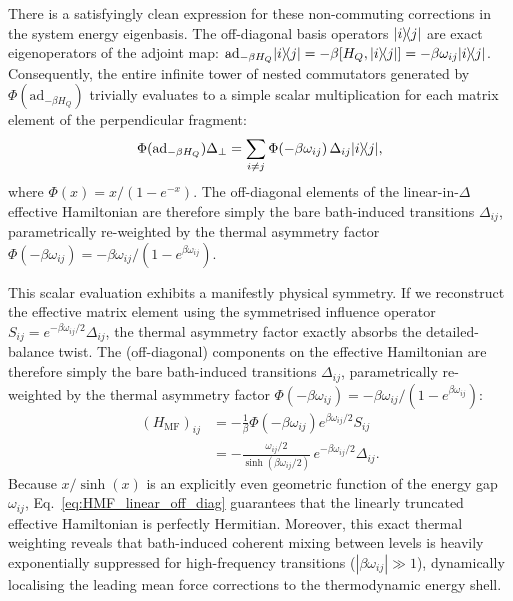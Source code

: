 There is a satisfyingly clean expression for these non-commuting corrections in the system energy eigenbasis. The off-diagonal basis operators $|i\rangle\!\langle j|$ are exact eigenoperators of the adjoint map: $\mathrm{ad}_{-\beta H_Q}|i\rangle\!\langle j| = -\beta [H_Q, |i\rangle\!\langle j|] = -\beta\omega_{ij}|i\rangle\!\langle j|$. Consequently, the entire infinite tower of nested commutators generated by $\Phi(\mathrm{ad}_{-\beta H_Q})$ trivially evaluates to a simple scalar multiplication for each matrix element of the perpendicular fragment:
\begin{equation}
    \Phi(\mathrm{ad}_{-\beta H_Q})\Delta_{\perp} = \sum_{i\neq j} \Phi(-\beta\omega_{ij})\,\Delta_{ij}|i\rangle\!\langle j|,
\end{equation}
where $\Phi(x) = x/(1-e^{-x})$. The off-diagonal elements of the linear-in-$\Delta$ effective Hamiltonian are therefore simply the bare bath-induced transitions $\Delta_{ij}$, parametrically re-weighted by the thermal asymmetry factor $\Phi(-\beta\omega_{ij}) = -\beta\omega_{ij}/(1-e^{\beta\omega_{ij}})$.

This scalar evaluation exhibits a manifestly physical symmetry. If we reconstruct the effective matrix element using the symmetrised influence operator $S_{ij} = e^{-\beta\omega_{ij}/2}\Delta_{ij}$, the thermal asymmetry factor exactly absorbs the detailed-balance twist. The (off-diagonal) components on the effective Hamiltonian are therefore simply the bare bath-induced transitions $\Delta_{ij}$, parametrically re-weighted by the thermal asymmetry factor $\Phi(-\beta\omega_{ij}) = -\beta\omega_{ij}/(1-e^{\beta\omega_{ij}})$:
\begin{equation}
\begin{split}
    (H_{\mathrm{MF}})_{ij} &= -\frac{1}{\beta}\Phi(-\beta\omega_{ij}) e^{\beta\omega_{ij}/2} S_{ij} \\
    &= -\frac{\omega_{ij}/2}{\sinh(\beta\omega_{ij}/2)}\, e^{-\beta\omega_{ij}/2} \Delta_{ij} .
\end{split}
    \label{eq:HMF_linear_off_diag}
\end{equation}
Because $x/\sinh(x)$ is an explicitly even geometric function of the energy gap $\omega_{ij}$, Eq.~\eqref{eq:HMF_linear_off_diag} guarantees that the linearly truncated effective Hamiltonian is perfectly Hermitian. Moreover, this exact thermal weighting reveals that bath-induced coherent mixing between levels is heavily exponentially suppressed for high-frequency transitions ($|\beta\omega_{ij}| \gg 1$), dynamically localising the leading mean force corrections to the thermodynamic energy shell.

